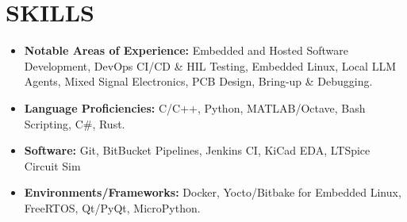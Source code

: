 
\section{SKILLS}
\begin{minipage}{\maincolumnwidth}%
	\small{
    	\begin{itemize}
        \item \textbf{Notable Areas of Experience:} Embedded and Hosted Software Development, DevOps CI/CD \& HIL Testing, Embedded Linux, Local LLM Agents, Mixed Signal Electronics, PCB Design, Bring-up \& Debugging.
        \item \textbf{Language Proficiencies:} C/C++, Python, MATLAB/Octave, Bash Scripting, C\#, Rust.
        \item \textbf{Software:} Git, BitBucket Pipelines, Jenkins CI, KiCad EDA, LTSpice Circuit Sim  
        \item \textbf{Environments/Frameworks:} Docker, Yocto/Bitbake for Embedded Linux, FreeRTOS, Qt/PyQt, MicroPython.
		\end{itemize}}%
\end{minipage}
      




